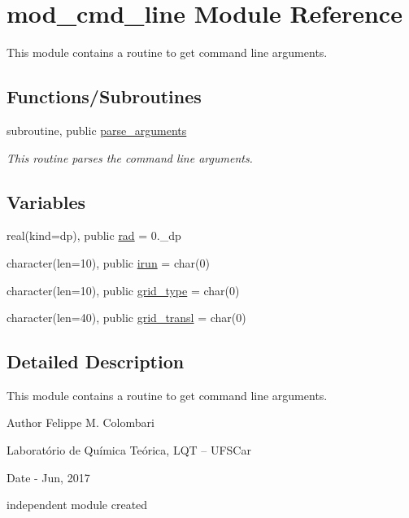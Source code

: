 \hypertarget{namespacemod__cmd__line}{}\section{mod\+\_\+cmd\+\_\+line Module Reference}
\label{namespacemod__cmd__line}


This module contains a routine to get command line arguments.  


\subsection*{Functions/\+Subroutines}
\begin{DoxyCompactItemize}
\item 
subroutine, public \hyperlink{namespacemod__cmd__line_a2869d8f148b9b3ad22cf98c7ac4fcc40}{parse\+\_\+arguments}
\begin{DoxyCompactList}\small\item\em This routine parses the command line arguments. \end{DoxyCompactList}\end{DoxyCompactItemize}
\subsection*{Variables}
\begin{DoxyCompactItemize}
\item 
real(kind=dp), public \hyperlink{namespacemod__cmd__line_aaec5fd5d1bccfc9f5d40a72568188667}{rad} = 0.\+\_\+dp
\item 
character(len=10), public \hyperlink{namespacemod__cmd__line_ae265e832b5cdb62595a1e0c2339c7e80}{irun} = char(0)
\item 
character(len=10), public \hyperlink{namespacemod__cmd__line_a8395cb7a13a767c9f0b8e4d6b0b5bbbe}{grid\+\_\+type} = char(0)
\item 
character(len=40), public \hyperlink{namespacemod__cmd__line_a63a7d7fabb7e0819c6f88e792f327d80}{grid\+\_\+transl} = char(0)
\end{DoxyCompactItemize}


\subsection{Detailed Description}
This module contains a routine to get command line arguments. 

\begin{DoxyAuthor}{Author}
Felippe M. Colombari
\begin{DoxyItemize}
\item Laboratório de Química Teórica, L\+QT -- U\+F\+S\+Car 
\end{DoxyItemize}
\end{DoxyAuthor}
\begin{DoxyDate}{Date}
-\/ Jun, 2017
\begin{DoxyItemize}
\item independent module created 
\end{DoxyItemize}
\end{DoxyDate}


